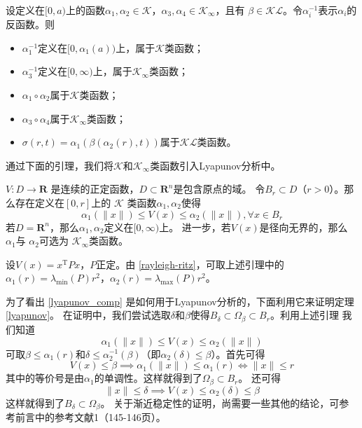 \begin{lemma}
  设定义在$[0,a)$上的函数$\alpha_{1},\alpha_{2}\in\mathcal{K}$，$\alpha_{3},\alpha_{4}\in\mathcal{K}_{\infty}$，且有
  $\beta\in\mathcal{KL}$。令$\alpha_{i}^{-1}$表示$\alpha_{i}$的反函数。则
  \begin{itemize}[leftmargin=1em]
    \item $\alpha_{1}^{-1}$定义在$[0,\alpha_{1}(a))$上，属于$\mathcal{K}$类函数；
    \item $\alpha_{3}^{-1}$定义在$[0,\infty)$上，属于$\mathcal{K}_\infty$类函数；
    \item $\alpha_{1} \circ\alpha_{2}$属于$\mathcal{K}$类函数；
    \item $\alpha_{3} \circ\alpha_{4}$属于$\mathcal{K}_\infty$类函数；
    \item $\sigma(r,t)=\alpha_{1}(\beta(\alpha_{2}(r),t)) $属于$\mathcal{K}\mathcal{L}$类函数。
  \end{itemize}
\end{lemma}

通过下面的引理，我们将$\mathcal{K}$和$\mathcal{K}_\infty$类函数引入Lyapunov分析中。

\begin{lemma}\label{lyapunov_comp}
  $V : D \rightarrow \mathbf{R}$ 是连续的正定函数，$D\subset\mathbf{R}^n$是包含原点的域。
  令$B_r\subset D$（$r>0$）。那么存在定义在$[0,r]$上的
  $\mathcal{K}$ 类函数$\alpha_1,\alpha_2$使得
  \[ \alpha_1 (\| x \|) \leq V (x) \leq \alpha_2 (\| x \|), \forall x \in B_r \]
  若$D =\mathbf{R}^n$，那么$\alpha_1,\alpha_2$定义在$[0,\infty)$上。
  进一步，若$V(x)$是径向无界的，那么 $\alpha_1$与 $\alpha_2$可选为 $\mathcal{K}_{\infty}$类函数。
\end{lemma}

\begin{example}
  设$V (x) = x^\mathrm{T} P  x$，$P$正定。由 \ref{rayleigh-ritz}，可取上述引理中的$\alpha_1(r)=\lambda_{\min} (P)r^2$，$\alpha_2(r)=\lambda_{\max} (P)r^2$。
\end{example}
为了看出 \ref{lyapunov_comp} 是如何用于Lyapunov分析的，下面利用它来证明定理 \ref{lyapunov}。
在证明中，我们尝试选取$\delta$和$\beta$使得$B_\delta\subset\Omega_\beta\subset B_r$。利用上述引理
我们知道\[\alpha_1 (\| x \|) \leq V (x) \leq \alpha_2 (\| x \|)\]
可取$\beta\le\alpha_1(r)$和$\delta\le\alpha_2^{-1}(\beta)$（即$\alpha_2(\delta)\le\beta$）。首先可得
\[V(x)\le\beta\implies\alpha_1(\|x\|)\le\alpha_1(r)\iff \|x\|\le r\]
其中的等价号是由$\alpha_1$的单调性。这样就得到了$\Omega_\beta\subset B_r$。
还可得\[\|x\|\le\delta\implies V(x)\le\alpha_2(\delta)\le\beta\]
这样就得到了$B_\delta\subset\Omega_\beta$。
关于渐近稳定性的证明，尚需要一些其他的结论，可参考前言中的参考文献1（145-146页）。

